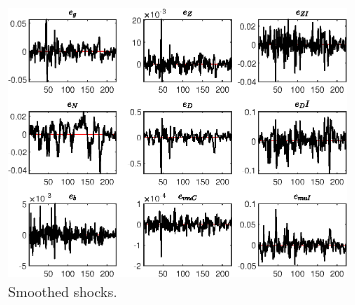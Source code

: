  
\begin{figure}[H]
\centering 
\includegraphics[width=0.80\textwidth]{BRS_sectoral_wo_vcu/graphs/BRS_sectoral_wo_vcu_SmoothedShocks1}
\caption{Smoothed shocks.}\label{Fig:SmoothedShocks:1}
\end{figure}


